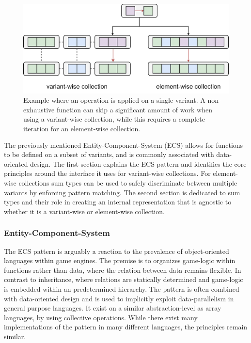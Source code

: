 \documentclass{article}
\begin{document}
\begin{figure}[ht]
    \centering
    \includegraphics[scale=0.06]{ConceptualFramework.png}
    \caption
    {
        Example where an operation is applied on a single variant.
        A non-exhaustive function can skip a significant amount of work when using a variant-wise collection, while this requires a complete iteration for an element-wise collection. 
    }
\end{figure}

The previously mentioned Entity-Component-System (ECS) allows for functions to be defined on a subset of variants, and is commonly associated with data-oriented design.
The first section explains the ECS pattern and identifies the core principles around the interface it uses for variant-wise collections.
For element-wise collections sum types can be used to safely discriminate between multiple variants by enforcing pattern matching.
The second section is dedicated to sum types and their role in creating an internal representation that is agnostic to whether it is a variant-wise or element-wise collection.  

\newpage

\subsubsection{Entity-Component-System}

The ECS pattern is arguably a reaction to the prevalence of object-oriented languages within game engines.
The premise is to organizes game-logic within functions rather than data, where the relation between data remains flexible\cite{ecs-origin}.
In contrast to inheritance, where relations are statically determined and game-logic is embedded within an predetermined hierarchy.
The pattern is often combined with data-oriented design and is used to implicitly exploit data-parallelism in general purpose languages.
It exist on a similar abstraction-level as array languages, by using collective operations. 
While there exist many implementations of the pattern in many different languages, the principles remain similar.  
\end{document}
